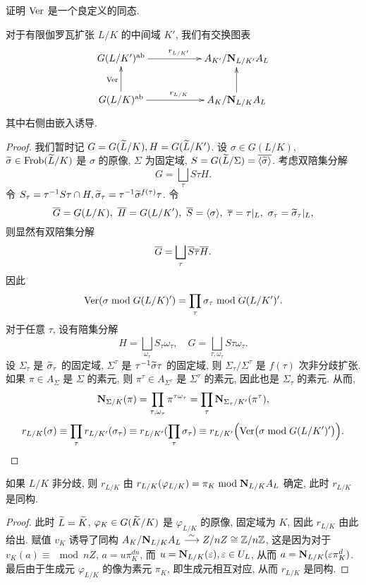 \begin{exercise}
证明 ${\mathrm{Ver}}$ 是一个良定义的同态.
\end{exercise}

\begin{proposition}{}{}
对于有限伽罗瓦扩张 $L/K$ 的中间域 $K'$, 我们有交换图表
  \[\xymatrix{
G(L/K')^\ab\ar[rr]^{r_{L/K'}}&& A_{K'}/\bfN_{L/K'}A_L\\
G(L/K)^\ab\ar[u]^{\Ver}\ar[rr]^{r_{L/K}}&&A_K/\bfN_{L/K}A_L\ar[u],
}\]
其中右侧由嵌入诱导.
\end{proposition}
\begin{proof}
我们暂时记 $G=G(\widetilde L/K),H=G(\widetilde L/K')$.
设 $\sigma\in G(L/K)$, $\widetilde \sigma\in{\mathrm{Frob}}(\widetilde L/K)$ 是 $\sigma$ 的原像, $\Sigma$ 为固定域, $S=G(\widetilde L/\Sigma)=\overline{\langle{\widetilde\sigma}\rangle}$. 考虑双陪集分解
  \[G=\bigsqcup_\tau S\tau H.\]
令 $S_\tau=\tau^{-1}S\tau\cap H,\widetilde\sigma_\tau=\tau^{-1}\widetilde\sigma^{f(\tau)}\tau$. 令
  \[\ov G=G(L/K),\ \ov H=G(L/K'),\ \ov S=\pair{\sigma},\ 
\ov\tau=\tau|_L,\ \sigma_\tau=\wt\sigma_\tau|_L,\]
则显然有双陪集分解
  \[\overline G=\bigsqcup_\tau \overline S\overline\tau \overline H.\]
因此
  \[{\mathrm{Ver}}(\sigma\bmod G(L/K)')=\prod_\tau\sigma_\tau\bmod G(L/K')'.\]
对于任意 $\tau$, 设有陪集分解
  \[H=\bigsqcup_{\omega_\tau}S_\tau\omega_\tau,\quad
G=\bigsqcup_{\tau,\omega_\tau}S\tau\omega_\tau.\]
设  $\Sigma_\tau$ 是 $\widetilde\sigma_\tau$ 的固定域, $\Sigma^\tau$ 是 $\tau^{-1}\widetilde \sigma\tau$ 的固定域, 则 $\Sigma_\tau/\Sigma^\tau$ 是 $f(\tau)$ 次非分歧扩张. 如果 $\pi\in A_\Sigma$ 是 $\Sigma$ 的素元, 则 $\pi^\tau\in A_{\Sigma^\tau}$ 是 $\Sigma^\tau$ 的素元, 因此也是 $\Sigma_\tau$ 的素元. 从而,
  \[{\mathbf{N}}_{\Sigma/K}(\pi)=\prod_{\tau,\omega_\tau}\pi^{\tau\omega_\tau}=\prod_\tau{\mathbf{N}}_{\Sigma_\tau/K'}(\pi^\tau),\]
  \[r_{L/K}(\sigma)\equiv \prod_\tau r_{L/K'}(\sigma_\tau)
\equiv r_{L/K'}(\prod_\tau\sigma_\tau)\equiv r_{L/K'}\Bigl({\mathrm{Ver}}\bigl(\sigma\bmod G(L/K')'\bigr)\Bigr).\]
\end{proof}


\begin{proposition}{}{}
如果 $L/K$ 非分歧, 则 $r_{L/K}$ 由 $r_{L/K}(\varphi_{L/K})=\pi_K\bmod{\mathbf{N}}_{L/K}A_L$ 确定, 此时 $r_{L/K}$ 是同构.
\end{proposition}
\begin{proof}
此时 $\widetilde L=\widetilde K$, $\varphi_K\in G(\widetilde K/K)$ 是 $\varphi_{L/K}$ 的原像, 固定域为 $K$, 因此 $r_{L/K}$ 由此给出. 赋值 $v_K$ 诱导了同构 $A_K/{\mathbf{N}}_{L/K}A_L\stackrel{\sim}{\longrightarrow} Z/nZ\cong {\mathbb{Z}}/n{\mathbb{Z}}$, 这是因为对于 $v_K(a)\equiv \mod nZ$, $a=u\pi_K^{dn}$, 而 $u={\mathbf{N}}_{L/K}(\varepsilon),\varepsilon\in U_L$, 从而 $a={\mathbf{N}}_{L/K}(\varepsilon \pi_K^d)$. 最后由于生成元 $\varphi_{L/K}$ 的像为素元 $\pi_K$, 即生成元相互对应, 从而 $r_{L/K}$ 是同构.
\end{proof}

